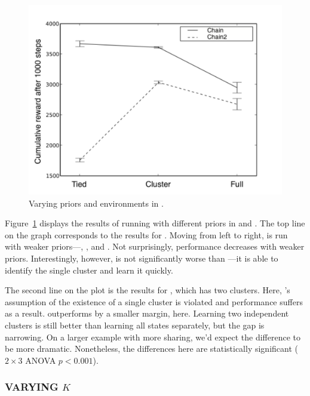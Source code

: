 \begin{figure}[t]
\begin{center}
\includegraphics[width=1.0\linewidth]{figures/2x3}
\caption{Varying priors and environments in .}
\label{f:twobythree}
\end{center}
\end{figure}

Figure~\ref{f:twobythree} displays the results of running  with
different priors in  and .  The top line on the graph
corresponds to the results for .  Moving from left to right, 
is run with weaker priors---, , and .  Not
surprisingly, performance decreases with weaker priors.
Interestingly, however,  is not significantly worse than
---it is able to identify the single cluster and learn it quickly.

The second line on the plot is the results for , which has two
clusters.  Here, 's assumption of the existence of a single
cluster is violated and performance suffers as a result.  
outperforms  by a smaller margin, here.  Learning two independent
clusters is still better than learning all states separately, but the
gap is narrowing.  On a larger example with more sharing, we'd expect
the difference to be more dramatic.  Nonetheless, the differences here
are statistically significant ($2\times 3$ ANOVA $p<0.001$).


\subsubsection{VARYING $K$}

